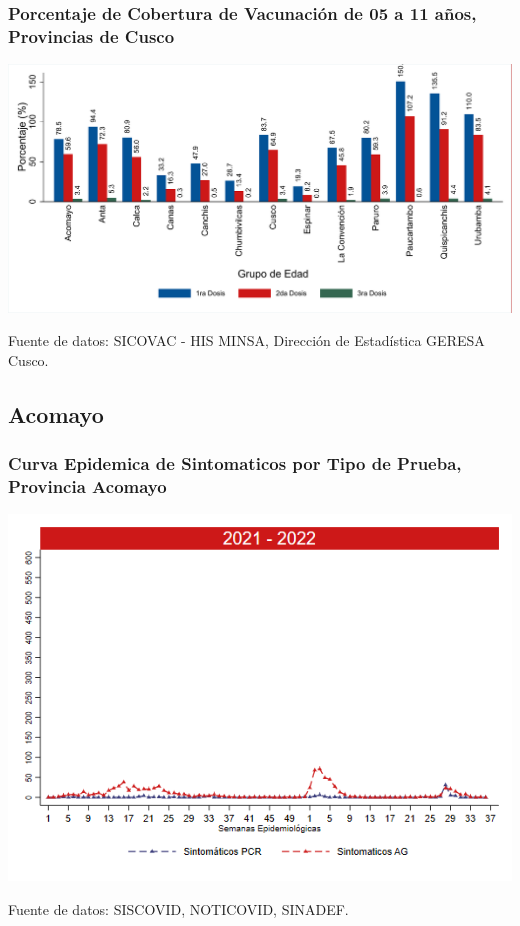 \documentclass[xcolor=table]{beamer}
\begin{document}
\begin{frame}[label=vacunas_10]
	\frametitle{Porcentaje de Cobertura de Vacunación de 05 a 11 años, Provincias de Cusco}
	\vspace{-.5cm}
	\begin{center}
		\includegraphics[width=1.0\linewidth, trim={.2cm .5cm .2cm .2cm},clip]{../figuras/vacunacion_provincial_edad_practica_1.pdf}
	\end{center}
	{\tiny Fuente de datos: SICOVAC - HIS MINSA, Dirección de Estadística GERESA Cusco. \\}
\hyperlink{cobertura_vacuna_provincias}{}
\end{frame}

\subsection{Acomayo}
\begin{frame}[label=Acomayo]
	\frametitle{Curva Epidemica de Sintomaticos por Tipo de Prueba, Provincia Acomayo}
	\vspace{-.5cm}
	\begin{center}
		\includegraphics[width=0.8\linewidth, trim={0cm .5cm 0cm 0.2cm},clip]{../figuras/sinto_prueba20_21_1.png}
	\end{center}
	{\tiny Fuente de datos: SISCOVID, NOTICOVID, SINADEF.}
	\hyperlink{TipoPrueba}{}
\end{frame}
\end{document}
